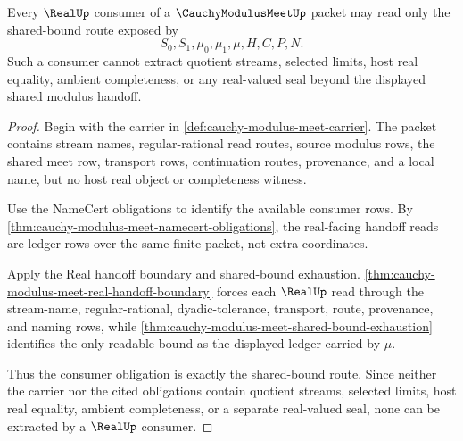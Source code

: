 \begin{theorem}\label{thm:cauchy-modulus-meet-real-seal-consumer-obligation}
Every $\RealUp$ consumer of a $\CauchyModulusMeetUp$ packet may read only the shared-bound route exposed by
$$
S_0,S_1,\mu_0,\mu_1,\mu,H,C,P,N.
$$
Such a consumer cannot extract quotient streams, selected limits, host real equality, ambient completeness, or any real-valued seal beyond the displayed shared modulus handoff.
\end{theorem}
\begin{proof}
Begin with the carrier in \autoref{def:cauchy-modulus-meet-carrier}. The packet contains stream names, regular-rational read routes, source modulus rows, the shared meet row, transport rows, continuation routes, provenance, and a local name, but no host real object or completeness witness.

Use the NameCert obligations to identify the available consumer rows. By \autoref{thm:cauchy-modulus-meet-namecert-obligations}, the real-facing handoff reads are ledger rows over the same finite packet, not extra coordinates.

Apply the Real handoff boundary and shared-bound exhaustion. \autoref{thm:cauchy-modulus-meet-real-handoff-boundary} forces each $\RealUp$ read through the stream-name, regular-rational, dyadic-tolerance, transport, route, provenance, and naming rows, while \autoref{thm:cauchy-modulus-meet-shared-bound-exhaustion} identifies the only readable bound as the displayed ledger carried by $\mu$.

Thus the consumer obligation is exactly the shared-bound route. Since neither the carrier nor the cited obligations contain quotient streams, selected limits, host real equality, ambient completeness, or a separate real-valued seal, none can be extracted by a $\RealUp$ consumer.
\end{proof}

